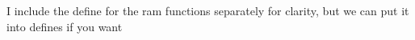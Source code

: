 
\begin{DoxyRefList}
\item[\label{todo__todo000001}%
\hypertarget{todo__todo000001}{}%
Member \hyperlink{ramdisk__ioctl_8c_ad94b36675e7eb067ea3ce6ff9e244a44}{M\-O\-D\-U\-L\-E\-\_\-\-L\-I\-C\-E\-N\-S\-E} (\char`\"{}\-G\-P\-L\char`\"{})]I include the define for the ram functions separately for clarity, but we can put it into defines if you want 
\end{DoxyRefList}